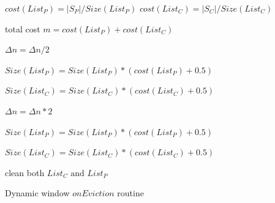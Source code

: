 \newpage
\begin{algorithm}[htbp]
    \DontPrintSemicolon

    $cost(List_P) = |S_P| / Size(List_P)$       
    $cost(List_C) = |S_C| / Size(List_C)$       


    total cost $ m = cost(List_P) + cost(List_C)$  
  
    {
        $\Delta n = \Delta n / 2 $ 
        
        $Size(List_P) = Size(List_P) * (cost(List_P) + 0.5)$  

        $Size(List_C) = Size(List_C) * (cost(List_C) + 0.5)$  
    }
    {
        $\Delta n = \Delta n * 2$ 

        $Size(List_P) = Size(List_P) * (cost(List_P) + 0.5)$  

        $Size(List_C) = Size(List_C) * (cost(List_C) + 0.5)$  
    }

    clean both $List_C \text{ and } List_P$
    \caption{Dynamic window $onEviction$ routine}
    \label{alg:dynamic_eviction}
\end{algorithm}







 




